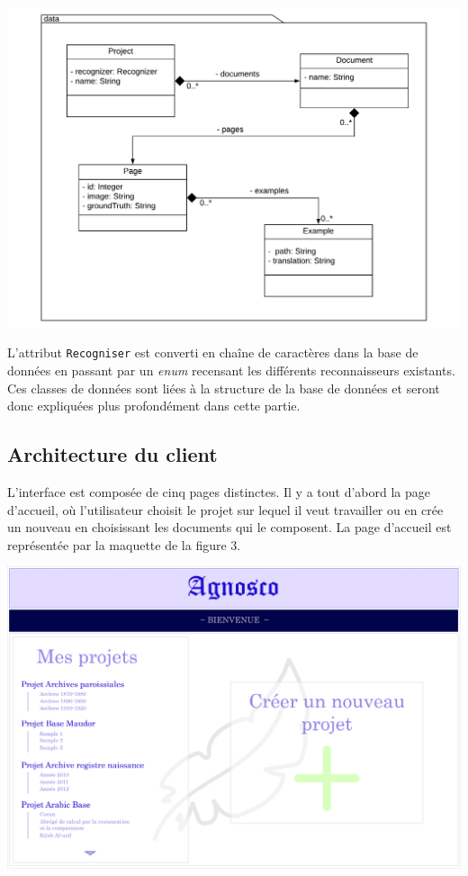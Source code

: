 \begin{mdframed}[frametitle={Figure 2 : Structure du package de données}, innerbottommargin=10]
\begin{center}
\includegraphics[scale=0.4]{assets/UML_data.pdf}
\end{center}
\end{mdframed}

L'attribut \texttt{Recogniser} est converti en chaîne de caractères dans la base de données en passant par un \textit{enum} recensant les différents reconnaisseurs existants. Ces classes de données sont liées à la structure de la base de données et seront donc expliquées plus profondément dans cette partie.

\subsection{Architecture du client}
L'interface est composée de cinq pages distinctes. Il y a tout d'abord la page d'accueil, où l'utilisateur choisit le projet sur lequel il veut travailler ou en crée un nouveau en choisissant les documents qui le composent. La page d'accueil est représentée par la maquette de la figure 3.

\begin{mdframed}[frametitle={Figure 3 : Maquette de la page d'accueil de l'IHM}, innerbottommargin=10]
\begin{center}
\includegraphics[scale=0.04]{assets/maquetteIHMaccueil.jpg}
\end{center}
\end{mdframed}

